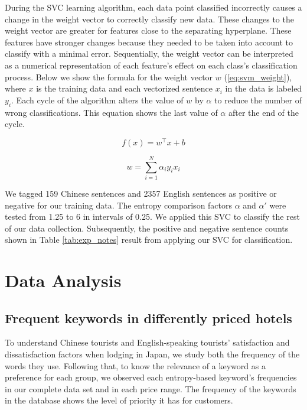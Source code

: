 \documentclass[smallextended,natbib]{svjour3}       %
\begin{document}
    During the SVC learning algorithm, each data point classified incorrectly causes a change in the weight vector to correctly classify new data. These changes to the weight vector are greater for features close to the separating hyperplane. These features have stronger changes because they needed to be taken into account to classify with a minimal error. Sequentially, the weight vector can be interpreted as a numerical representation of each feature's effect on each class's classification process. Below we show the formula for the weight vector \(w\) (\ref{eq:svm_weight}), where \(x\) is the training data and each vectorized sentence \(x_i\) in the data is labeled \(y_i\). Each cycle of the algorithm alters the value of \(w\) by \(\alpha\) to reduce the number of wrong classifications. This equation shows the last value of \(\alpha\) after the end of the cycle.

    \begin{equation}\label{eq:svm1}
    f(x) = w^\top x + b
    \end{equation}

    \begin{equation}\label{eq:svm_weight}
    w = \sum_{i=1}^N \alpha_i y_i x_i
    \end{equation}

    We tagged 159 Chinese sentences and \num[group-separator={,}]{2357} English sentences as positive or negative for our training data. The entropy comparison factors \(\alpha\) and \(\alpha'\) were tested from 1.25 to 6 in intervals of 0.25. We applied this SVC to classify the rest of our data collection. Subsequently, the positive and negative sentence counts shown in Table \ref{tab:exp_notes} result from applying our SVC for classification.

\section{Data Analysis}\label{dataanalysis}

  \subsection{Frequent keywords in differently priced hotels}\label{svmresults}

    To understand Chinese tourists and English-speaking tourists' satisfaction and dissatisfaction factors when lodging in Japan, we study both the frequency of the words they use. Following that, to know the relevance of a keyword as a preference for each group, we observed each entropy-based keyword's frequencies in our complete data set and in each price range. The frequency of the keywords in the database shows the level of priority it has for customers.
\end{document}
